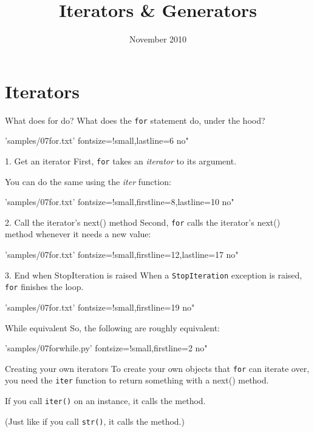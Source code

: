 \documentclass{pyslides}
\title{Iterators \& Generators}
\date{November 2010}
\begin{document}
\begin{frame}\titlepage\end{frame}
\section{Iterators}

\begin{frame}[fragile]{What does for do?}
What does the \texttt{for} statement do, under the hood?

 'samples/07for.txt' fontsize=!small,lastline=6 no"
\end{frame}

\begin{frame}[fragile]{1. Get an iterator}
First, \texttt{for} takes an \emph{iterator} to its argument.

You can do the same using the \emph{iter} function:

 'samples/07for.txt' fontsize=!small,firstline=8,lastline=10 no"
\end{frame}

\begin{frame}[fragile]{2. Call the iterator's next() method}
Second, \texttt{for} calls the iterator's next() method whenever it needs a new value:

 'samples/07for.txt' fontsize=!small,firstline=12,lastline=17 no"
\end{frame}

\begin{frame}[fragile]{3. End when StopIteration is raised}
When a \texttt{StopIteration} exception is raised, \texttt{for} finishes the loop.

 'samples/07for.txt' fontsize=!small,firstline=19 no"
\end{frame}

\begin{frame}[fragile]{While equivalent}
So, the following are roughly equivalent:

 'samples/07forwhile.py' fontsize=!small,firstline=2 no"
\end{frame}

\begin{frame}[fragile]{Creating your own iterators}
To create your own objects that \texttt{for} can iterate over, you need the \texttt{iter} function to return something with a next() method.

\bigskip

If you call \texttt{iter()} on an instance, it calls the \texttt{} method.

{\small (Just like if you call \texttt{str()}, it calls the \texttt{} method.)}
\end{frame}
\end{document}

